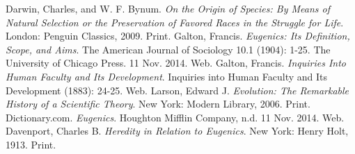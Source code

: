\documentclass[11pt, oneside]{article}
\begin{document}
\begin{thebibliography}{9}
  Darwin, Charles, and W. F. Bynum.
  \emph{On the Origin of Species: By Means of Natural Selection or the Preservation of Favored Races in the Struggle for Life}.
  London: Penguin Classics, 2009.
  Print.
  Galton, Francis.
  \emph{Eugenics: Its Definition, Scope, and Aims}.
  The American Journal of Sociology 10.1 (1904): 1-25.
  The University of Chicago Press. 11 Nov. 2014.
  Web.
  Galton, Francis.
  \emph{Inquiries Into Human Faculty and Its Development}.
  Inquiries into Human Faculty and Its Development (1883): 24-25. 
  Web.
  Larson, Edward J.
  \emph{Evolution: The Remarkable History of a Scientific Theory}.
  New York: Modern Library, 2006. 
  Print.
  Dictionary.com.
  \emph{Eugenics}.
  Houghton Mifflin Company, n.d. 11 Nov. 2014.  
  Web.
  Davenport, Charles B.
  \emph{Heredity in Relation to Eugenics}.
  New York: Henry Holt, 1913.  
  Print.
\end{thebibliography}
\end{document}
